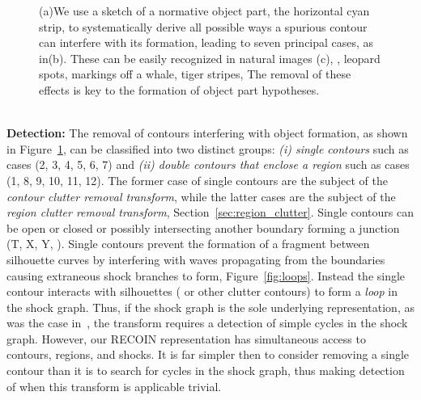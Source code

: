 \begin{figure}[!ht]
{}
\caption{(a)We use a sketch of a normative object part, the horizontal cyan
strip, to systematically derive all possible ways a spurious contour can
 interfere with its formation, leading to  seven
principal cases, as in(b). These can be easily recognized in natural images (c), \eg, leopard spots, markings off a whale, tiger stripes,
\etc  The removal of these effects is key to the formation of object part hypotheses.}
   \label{fig:loop_transforms}
\end{figure}







\noindent\\
{\bf Detection:} The removal of contours interfering with object formation, as shown in Figure~\ref{fig:loop_transforms}, can be classified into two distinct groups: \emph{(i) single contours} such as cases (2, 3, 4, 5, 6, 7) and \emph{ (ii) double contours that enclose a region} such as cases (1, 8, 9, 10, 11, 12). The former case of single contours are the subject of the \emph{contour clutter removal transform}, while the latter cases are the subject of the \emph{region clutter removal transform}, Section~\ref{sec:region_clutter}. Single contours can be open or closed or possibly intersecting another boundary forming a junction (T, X, Y, \etc). Single contours prevent the formation of a fragment between silhouette curves by interfering with waves propagating from the boundaries causing extraneous shock branches to form, Figure~\ref{fig:loops}. Instead the single contour interacts with silhouettes ( or other clutter contours) to form a \emph{loop} in the shock graph. Thus, if the shock graph is the sole underlying representation, as was the case in~\cite{Johannes:POCV2001}, the transform requires a detection of simple cycles in the shock graph. However, our RECOIN representation has simultaneous access to contours, regions, and shocks. It is far simpler then to consider removing a single contour than it is to search for cycles in the shock graph, thus making detection of when this transform is applicable trivial.


